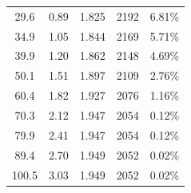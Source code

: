 \documentclass{thuemp}
\begin{document}
\begin{table}[H]
\begin{tabular}{ccccc}
        29.6  & 0.89  & 1.825 & 2192 &  6.81\%  \\
        34.9  & 1.05  & 1.844 & 2169 &  5.71\%  \\
        39.9  & 1.20  & 1.862 & 2148 &  4.69\%  \\
        50.1  & 1.51  & 1.897 & 2109 &  2.76\%  \\
        60.4  & 1.82  & 1.927 & 2076 &  1.16\%  \\
        70.3  & 2.12  & 1.947 & 2054 &  0.12\%  \\
        79.9  & 2.41  & 1.947 & 2054 &  0.12\%  \\
        89.4  & 2.70  & 1.949 & 2052 &  0.02\%  \\
        100.5 & 3.03  & 1.949 & 2052 &  0.02\%  \\
        \bottomrule
    \end{tabular}
\end{table}
\end{document}
